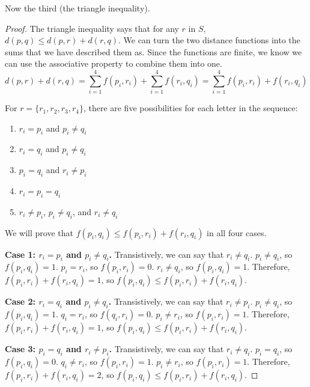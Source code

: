 \documentclass[11pt]{article}
\begin{document}
        Now the third (the triangle inequality).
        \begin{proof}
            The triangle inequality says that for any $r$ in $S$, $d(p,q) \leq d(p,r) + d(r,q)$.
            We can turn the two distance functions into the sums that we have described them as.
            Since the functions are finite, we know we can use the associative property to combine them into one.
            \begin{equation}
                d(p,r) + d(r,q) = \sum_{i = 1}^{4} f(p_i, r_i) + \sum_{i = 1}^{4} f(r_i, q_i)
                =   \sum_{i = 1}^{4} f(p_i, r_i) + f(r_i, q_i)
            \end{equation}

            For $r = \{r_1, r_2, r_3, r_4\}$, there are five possibilities for each letter in the sequence: 
            \begin{enumerate}
                \item   $r_i = p_i$ and $p_i \neq q_i$
                \item   $r_i = q_i$ and $p_i \neq q_i$
                \item   $p_i = q_i$ and $r_i \neq p_i$
                \item   $r_i = p_i = q_i$
                \item   $r_i \neq p_i$, $p_i \neq q_i$, and $r_i \neq q_i$
            \end{enumerate}
            We will prove that $f(p_i,q_i) \leq f(p_i, r_i) + f(r_i, q_i)$ in all four cases.

            \textbf{Case 1: $r_i = p_i$ and $p_i \neq q_i$.}
            Transistively, we can say that $r_i \neq q_i$.
            $p_i \neq q_i$, so $f(p_i,q_i) = 1$.
            $p_i = r_i$, so $f(p_i,r_i) = 0$.
            $r_i \neq q_i$, so $f(p_i,q_i) = 1$.
            Therefore,  $f(p_i, r_i) + f(r_i, q_i) = 1$, so $f(p_i,q_i) \leq f(p_i, r_i) + f(r_i, q_i)$.

            \textbf{Case 2: $r_i = q_i$ and $p_i \neq q_i$.}
            Transistively, we can say that $r_i \neq p_i$.
            $p_i \neq q_i$, so $f(p_i,q_i) = 1$.
            $q_i = r_i$, so $f(q_i,r_i) = 0$.
            $p_i \neq r_i$, so $f(p_i,r_i) = 1$.
            Therefore,  $f(p_i, r_i) + f(r_i, q_i) = 1$, so $f(p_i,q_i) \leq f(p_i, r_i) + f(r_i, q_i)$.

            \textbf{Case 3: $p_i = q_i$ and $r_i \neq p_i$.}
            Transistively, we can say that $r_i \neq q_i$.
            $p_i = q_i$, so $f(p_i,q_i) = 0$.
            $q_i \neq r_i$, so $f(p_i,r_i) = 1$.
            $p_i \neq r_i$, so $f(p_i,r_i) = 1$.
            Therefore,  $f(p_i, r_i) + f(r_i, q_i) = 2$, so $f(p_i,q_i) \leq f(p_i, r_i) + f(r_i, q_i)$.


\end{proof}
\end{document}
